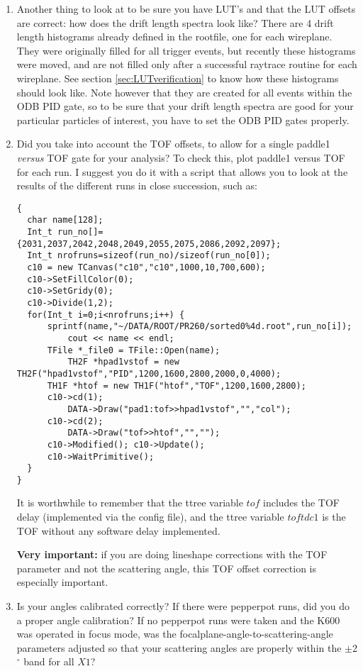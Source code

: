 \documentclass[11pt]{report}
\begin{document}
\begin{enumerate}
\item 
Another thing to look at to be sure you have LUT's and that the LUT offsets are correct: how does the drift length spectra look like?
There are 4 drift length histograms already defined in the rootfile, one for each wireplane.
They were originally filled for all trigger events, but recently these histograms were moved, and are not filled only
after a successful raytrace routine for each wireplane.
See section \ref{sec:LUTverification} to know how these histograms should look like.
Note however that they are created for all events within the ODB PID gate, so to be sure that your drift length spectra
are good for your particular particles of interest, you have to set the ODB PID gates properly.


\item 
Did you take into account the TOF offsets, to allow for a single paddle1 {\it versus} TOF gate
for your analysis?  To check this, plot paddle1 versus TOF for each run. I suggest you
do it with a script that allows you to look at the results of the different runs in close
succession, such as:
\begin{verbatim}
{
  char name[128];
  Int_t run_no[]={2031,2037,2042,2048,2049,2055,2075,2086,2092,2097};
  Int_t nrofruns=sizeof(run_no)/sizeof(run_no[0]);  
  c10 = new TCanvas("c10","c10",1000,10,700,600);
  c10->SetFillColor(0);
  c10->SetGridy(0);
  c10->Divide(1,2);
  for(Int_t i=0;i<nrofruns;i++)	{
	  sprintf(name,"~/DATA/ROOT/PR260/sorted0%4d.root",run_no[i]);
          cout << name << endl;
	  TFile *_file0 = TFile::Open(name);     
          TH2F *hpad1vstof = new TH2F("hpad1vstof","PID",1200,1600,2800,2000,0,4000);
  	  TH1F *htof = new TH1F("htof","TOF",1200,1600,2800);
	  c10->cd(1);
          DATA->Draw("pad1:tof>>hpad1vstof","","col");
	  c10->cd(2);
          DATA->Draw("tof>>htof","","");
	  c10->Modified(); c10->Update();
	  c10->WaitPrimitive(); 
  }
}
\end{verbatim}
It is worthwhile to remember that the ttree variable $tof$ includes the TOF delay (implemented
via the config file), and the
ttree variable $toftdc1$ is the TOF without any software delay implemented.

{\bf Very important:} if you are doing lineshape corrections with the TOF parameter and not
the scattering angle, this TOF offset correction is especially important.

\item 
Is your angles calibrated correctly? If there were pepperpot runs, did you do a proper angle 
calibration? If no pepperpot runs were taken and the K600 was operated in focus mode, was
the focalplane-angle-to-scattering-angle parameters adjusted so that your scattering angles
are properly within the $\pm$2$^{\circ}$ band for all $X1$?


\end{enumerate}
\end{document}
